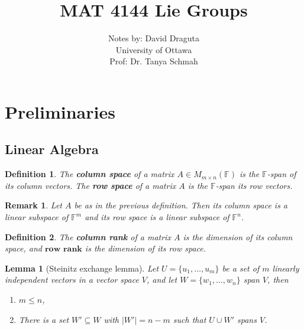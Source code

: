 \documentclass[12pt]{article}
\newcommand{\card}[1]{|#1|}
\newcommand\set[1]{\{#1\}}
\newtheorem{defn}{Definition}[thm]
\newtheorem*{remark}{Remark}
\newtheorem{lemma}{Lemma}[thm]
\begin{document}
  
\tableofcontents
\date{}

\title{MAT 4144 Lie Groups}
\author{Notes by: David Draguta
  \\University of Ottawa\\ Prof: Dr. Tanya Schmah } 
 
\maketitle
\section{Preliminaries}


\subsection{Linear Algebra}
\begin{defn}
  The \textbf{column space} of a matrix $A \in M_{m \times n}(\mathbb{F})$ is the $\mathbb{F}$-span of its column vectors. The \textbf{row space} of a matrix $A$ is the $\mathbb{F}$-span its row vectors. 
\end{defn}
\begin{remark}
  Let $A$ be as in the previous definition. Then its  column space is a linear subspace of $\mathbb{F}^m$ and its row space is a linear subspace of $\mathbb{F}^n$.
\end{remark}
\begin{defn}
  The \textbf{column rank} of a matrix $A$ is the dimension of its column space, and $\textbf{row rank}$ is the dimension of its row space.
\end{defn}
\begin{lemma}[Steinitz exchange lemma]
  Let $U= \set{u_1, \dots, u_m}$ be a set of $m$ linearly independent vectors in a vector space $V$,
  and let $W=\set{w_1, \dots, w_n}$ span $V$, then
  \begin{enumerate}
  \item $m \leq n$, 
  \item There is a set $W' \subseteq W$ with $\card{W'} = n - m$ such that $U \cup W'$ spans $V$.
  \end{enumerate}
\end{lemma}
\end{document}
